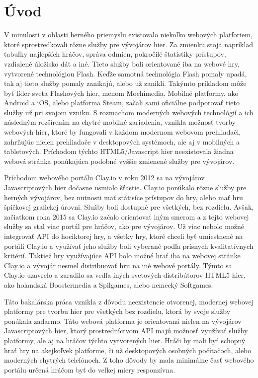 
\chapter{Úvod}
\label{chap:uvod}
V minulosti v oblasti herného priemyslu existovalo niekoľko webových platforiem, ktoré sprostredkovali rôzne služby pre vývojárov hier. Za zmienku stoja napríklad tabuľky najlepších hráčov, správa odmien, pokročilé štatistiky prístupov, vzdialené úložisko dát a iné. Tieto služby boli orientované iba na webové hry, vytvorené technológiou Flash. Keďže samotná technológia Flash pomaly upadá, tak aj tieto služby pomaly zanikajú, alebo už zanikli. Takýmto príkladom môže byť líder sveta Flashových hier, menom Mochimedia. Mobilné platformy, ako Android a iOS, alebo platforma Steam, začali sami oficiálne podporovať tieto služby už pri svojom vzniku. S rozmachom moderných webových technológií a ich následným rozšírením na chytré mobilné zariadenia, vznikla možnosť tvorby webových hier, ktoré by fungovali v každom modernom webovom prehliadači, zahrňujúc nielen prehliadače v desktopových systémoch, ale aj v mobilných a tabletových.  Príchodom týchto HTML5/Javascript hier neexistovala žiadna webová stránka ponúkajúca podobné vyššie zmienené služby pre vývojárov. 

Príchodom webového portálu Clay.io v roku 2012 sa na vývojárov Javascriptových hier dočasne usmialo šťastie. Clay.io ponúkalo rôzne služby pre herných vývojárov, bez nutnosti mať státisíce prístupov do hry, alebo mať hru špičkovej grafickej úrovni. Služby boli dostupné pre všetkých, bez rozdielu. Avšak, začiatkom roka 2015 sa Clay.io začalo orientovať iným smerom a z tejto webovej služby sa stal viac portál pre hráčov, ako pre vývojárov. Už viac nebolo možné integrovať API do hociktorej hry, a všetky hry, ktoré chceli byť umiestnené na portáli Clay.io a využívať jeho služby boli vyberané podľa prísnych kvalitatívnych kritérií. Taktiež hry využívajúce API bolo možné hrať iba na webovej stránke Clay.io a vývojár nesmel distribuovať hru na iné webové portály. Týmto sa Clay.io uzavrelo a zaradilo sa vedľa iných svetových distribútorov HTML5 hier, ako holandská Boostermedia a Spilgames, alebo nemecký Softgames.

Táto bakalárska práca vznikla z dôvodu neexistencie otvorenej, modernej webovej platformy pre tvorbu hier pre všetkých bez rozdielu, ktorá by svoje služby ponúkala zadarmo. Táto webová platforma je orientovaná nielen na vývojárov Javascriptových hier, ktorý prostredníctvom API majú možnosť využívať služby platformy, ale aj na hráčov týchto vytvorených hier. Hráči by mali byť schopný hrať hry na akejkoľvek platforme, či už desktopových osobných počítačoch, alebo moderných chytrých telefónoch. Z toho dôvody by mala minimálne časť webového portálu určená hráčom byť do veľkej miery responzívna.

